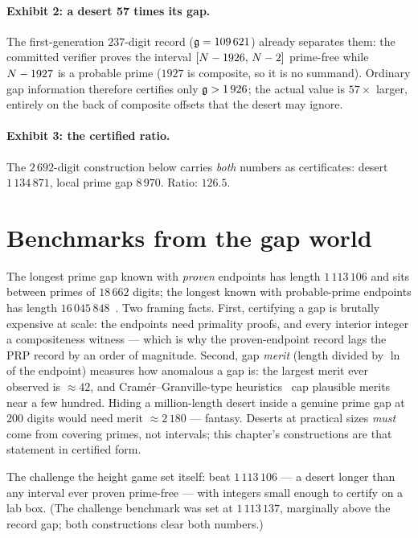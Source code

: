\paragraph{Exhibit 2: a desert 57 times its gap.} The first-generation
$237$-digit record ($\mathfrak{g}=109\,621$) already separates them: the
committed verifier proves the interval $[N-1926,\,N-2]$ prime-free
while $N-1927$ is a probable prime ($1927$ is composite, so it is no
summand). Ordinary gap information therefore certifies only
$\mathfrak{g}>1\,926$; the actual value is $57\times$ larger, entirely on the
back of composite offsets that the desert may ignore.

\paragraph{Exhibit 3: the certified ratio.} The $2\,692$-digit
construction below carries \emph{both} numbers as certificates: desert
$1\,134\,871$, local prime gap $8\,970$. Ratio: $126.5$.

\section{Benchmarks from the gap world}\label{sec:benchmarks}

The longest prime gap known with \emph{proven} endpoints has length
$1\,113\,106$ and sits between primes of $18\,662$ digits; the longest
known with probable-prime endpoints has length
$16\,045\,848$~\cite{GapList}. Two framing facts. First, certifying a
gap is brutally expensive at scale: the endpoints need primality
proofs, and every interior integer a compositeness witness ---
which is why the proven-endpoint record lags the PRP record by an order
of magnitude. Second, gap \emph{merit} (length divided by $\ln$ of the
endpoint) measures how anomalous a gap is: the largest merit ever
observed is $\approx42$, and Cram\'er--Granville-type
heuristics~\cite{GranvilleCramer} cap plausible merits near a few
hundred. Hiding a million-length desert inside a genuine prime gap at
$200$ digits would need merit $\approx2\,180$ --- fantasy. Deserts at
practical sizes \emph{must} come from covering primes, not intervals;
this chapter's constructions are that statement in certified form.

The challenge the height game set itself: beat $1\,113\,106$ ---
a desert longer than any interval ever proven prime-free --- with
integers small enough to certify on a lab box. (The challenge benchmark
was set at $1\,113\,137$, marginally above the record gap; both
constructions clear both numbers.)

